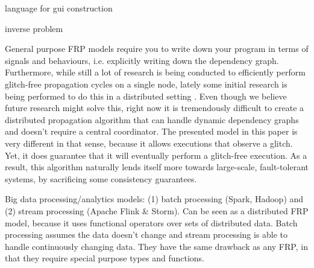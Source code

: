  

\cite{burckhardt-leijen-yi-sadowski-ball-OOPSLA11}
\cite{camil}


\cite{alive}
\cite{react}

\cite{elm} language for gui construction

\cite{statelines} inverse problem




General purpose FRP models \cite{reactivesurvey} require you to write down your program in terms of signals and behaviours, i.e. explicitly writing down the dependency graph. Furthermore, while still a lot of research is being conducted to efficiently perform glitch-free propagation cycles on a single node, lately some initial research is being performed to do this in a distributed setting \cite{elm}\cite{drescala}. Even though we believe future research might solve this, right now it is tremendously difficult to create a distributed propagation algorithm that can handle dynamic dependency graphs and doesn't require a central coordinator. The presented model in this paper is very different in that sense, because it allows executions that observe a glitch. Yet, it does guarantee that it will eventually perform a glitch-free execution. As a result, this algorithm naturally lends itself more towards large-scale, fault-tolerant systems, by sacrificing some consistency guarantees.


Big data processing/analytics models: (1) batch processing (Spark, Hadoop) \cite{mapreduce} and (2) stream processing (Apache Flink \& Storm). Can be seen as a  distributed FRP model, because it uses functional operators over sets of distributed data. Batch processing assumes the data doesn't change and stream processing is able to handle continuously changing data. They have the same drawback as any FRP, in that they require special purpose types and functions.

\cite{orleans}
